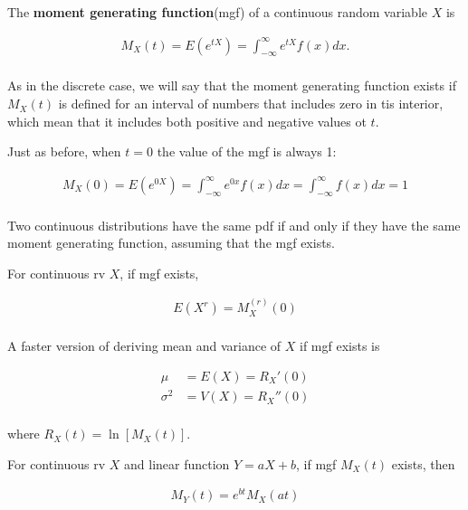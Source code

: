 \begin{definition}
    The \textbf{moment generating function}(mgf) of a continuous random variable $X$ is 

    \begin{align*}
        M_X(t) = E(e^{tX}) = \int_{-\infty}^\infty e^{tX} f(x) dx. \\
    \end{align*}

    As in the discrete case, we will say that the moment generating function exists if $M_X(t)$ is defined for an interval of numbers that includes zero in tis interior, which mean that it includes both positive and negative values ot $t$.

    Just as before, when $t=0$ the value of the mgf is always 1:

    \begin{align*}
        M_X(0) = E(e^{0X}) = \int_{-\infty}^\infty e^{0x} f(x) dx = \int_{-\infty}^\infty f(x) dx = 1 \\
    \end{align*}
\end{definition}

\begin{proposition}
    Two continuous distributions have the same pdf if and only if they have the same moment generating function, assuming that the mgf exists.
\end{proposition}

\begin{proposition}
    For continuous rv $X$, if mgf exists, 

    \begin{align*}
        E(X^r) = M_X^{(r)}(0) \\
    \end{align*}

    A faster version of deriving mean and variance of $X$ if mgf exists is

    \begin{align*}
        \mu & = E(X) = R_X'(0) \\
        \sigma^2 & = V(X) =R_X '' (0) \\
    \end{align*}

    where $R_X(t) = \ln[M_X(t)]$.
\end{proposition}

\begin{proposition}
    For continuous rv $X$ and linear function $Y=aX+b$, if mgf $M_X(t)$ exists, then 

    \begin{align*}
        M_Y(t) = e^{bt}M_X(at) \\
    \end{align*}
\end{proposition}

